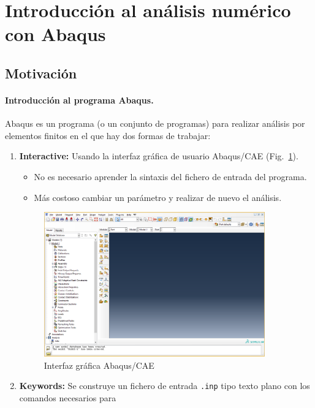 \section{Introducción al análisis numérico con Abaqus}

\subsection{Motivación}

\paragraph{Introducción al programa Abaqus.} Abaqus es un programa (o
un conjunto de programas) para realizar análisis por elementos finitos
en el que hay dos formas de trabajar:
\begin{enumerate}
\item \textbf{Interactive:} Usando la interfaz gráfica de usuario
  Abaqus/CAE (Fig.~\ref{figu10}).
  \begin{itemize}
  \item No es necesario aprender la sintaxis del fichero de entrada del programa.
  \item Más costoso cambiar un parámetro y realizar de nuevo el
    análisis.
  \end{itemize}
  \begin{figure}
    \begin{center}
      \includegraphics[width=0.9\textwidth]{./body/images/imagen10}
    \end{center}
    \caption{Interfaz gráfica Abaqus/CAE}
    \label{figu10}
  \end{figure}
\item \textbf{Keywords:} Se construye un fichero de entrada
  \texttt{.inp} tipo texto plano con los comandos necesarios para

\end{enumerate}
